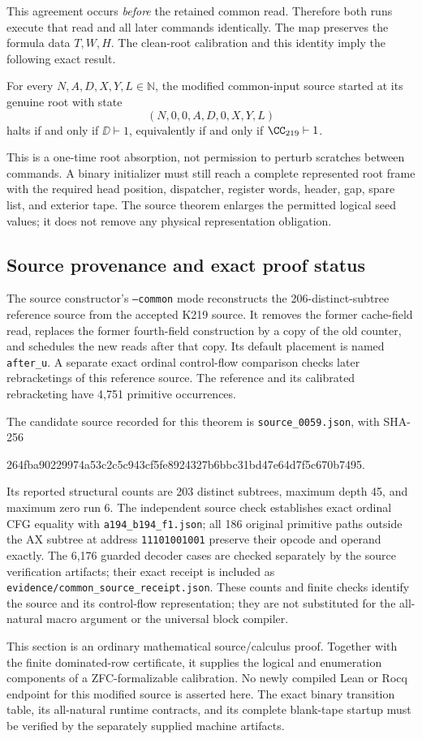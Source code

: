 This agreement occurs \emph{before} the retained common read.  Therefore
both runs execute that read and all later commands identically.
The map preserves the formula data $T,W,H$.  The clean-root calibration
and this identity imply the following exact result.
\begin{corollary}
For every $N,A,D,X,Y,L\in\mathbb N$, the modified common-input source
started at its genuine root with state
\[
 (N,0,0,A,D,0,X,Y,L)
\]
halts if and only if $\DD\vdash1$, equivalently if and only if
$\CC_{219}\vdash1$.
\end{corollary}
This is a one-time root absorption, not permission to perturb scratches
between commands.  A binary initializer must still reach a complete
represented root frame with the required head position, dispatcher,
register words, header, gap, spare list, and exterior tape.  The source
theorem enlarges the permitted logical seed values; it does not remove
any physical representation obligation.

\subsection{Source provenance and exact proof status}

The source constructor's \texttt{--common} mode reconstructs the
206-distinct-subtree reference source from the accepted K219 source.
It removes the former cache-field read, replaces the former fourth-field
construction by a copy of the old counter, and schedules the new reads
after that copy.  Its default placement is named \texttt{after\_u}.
A separate exact ordinal control-flow comparison checks later
rebracketings of this reference source.  The reference and its calibrated
rebracketing have 4,751 primitive occurrences.

The candidate source recorded for this theorem is
\texttt{source\_0059.json}, with SHA-256
\begin{center}\ttfamily\footnotesize
264fba90229974a53c2c5c943cf5fe8924327b6bbc31bd47e64d7f5c670b7495.
\end{center}
Its reported structural counts are 203 distinct subtrees, maximum depth
45, and maximum zero run 6.  The independent source check establishes
exact ordinal CFG equality with \texttt{a194\_b194\_f1.json}; all 186
original primitive paths outside the AX subtree at address
\texttt{11101001001} preserve their opcode and operand exactly.
The 6,176 guarded decoder cases are checked separately by the source
verification artifacts; their exact receipt is included as
\texttt{evidence/common\_source\_receipt.json}.  These counts and finite checks identify the
source and its control-flow representation; they are not substituted
for the all-natural macro argument or the universal block compiler.

This section is an ordinary mathematical source/calculus proof.
Together with the finite dominated-row certificate, it supplies the
logical and enumeration components of a ZFC-formalizable calibration.
No newly compiled Lean or Rocq endpoint for this modified source is
asserted here.  The exact binary transition table, its all-natural
runtime contracts, and its complete blank-tape startup must be verified
by the separately supplied machine artifacts.
